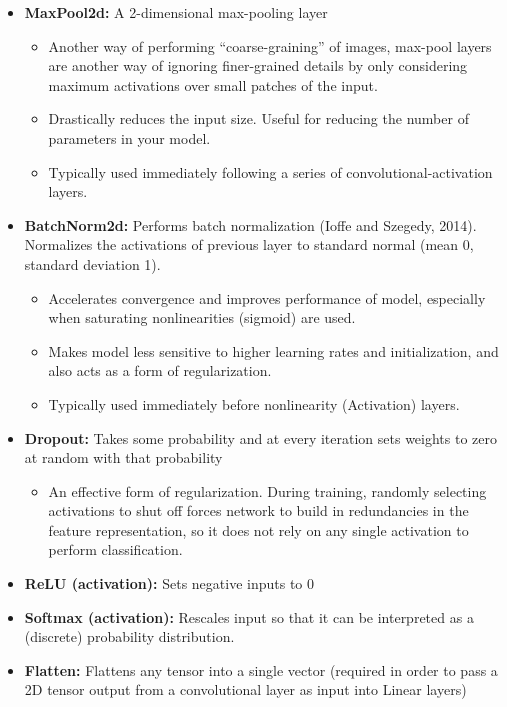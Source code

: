 \begin{itemize}
\begin{itemize}
  \end{itemize}
  \item \textbf{MaxPool2d:} A 2-dimensional max-pooling layer
  \begin{itemize}
    \item Another way of performing ``coarse-graining'' of images, max-pool layers are another way of ignoring finer-grained details by only considering maximum activations over small patches of the input.
    \item Drastically reduces the input size. Useful for reducing the number of parameters in your model.
    \item Typically used immediately following a series of convolutional-activation layers.
  \end{itemize}
  \item \textbf{BatchNorm2d:} Performs batch normalization (Ioffe and Szegedy, 2014). Normalizes the activations of previous layer to standard normal (mean 0, standard deviation 1).
  \begin{itemize}
    \item Accelerates convergence and improves performance of model, especially when saturating nonlinearities (sigmoid) are used.
    \item Makes model less sensitive to higher learning rates and initialization, and also acts as a form of regularization.
    \item Typically used immediately before nonlinearity (Activation) layers.
  \end{itemize}
  \item \textbf{Dropout:} Takes some probability and at every iteration sets weights to zero at random with that probability
  \begin{itemize}
    \item An effective form of regularization. During training, randomly selecting activations to shut off forces network to build in redundancies in the feature representation, so it does not rely on any single activation to perform classification.
  \end{itemize}
  \item \textbf{ReLU (activation):} Sets negative inputs to 0
  \item \textbf{Softmax (activation):} Rescales input so that it can be interpreted as a (discrete) probability distribution.
  \item \textbf{Flatten:} Flattens any tensor into a single vector (required in order to pass a 2D tensor output from a convolutional layer as input into Linear layers)
\end{itemize}

